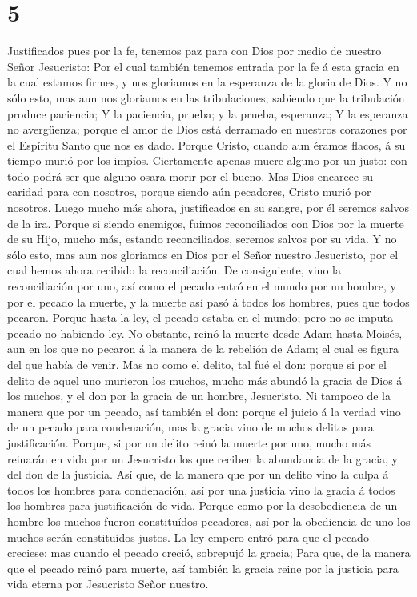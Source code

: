 \hypertarget{section-4}{%
\section{5}\label{section-4}}

 Justificados pues por la fe, tenemos paz para con Dios
por medio de nuestro Señor Jesucristo:  Por el cual
también tenemos entrada por la fe á esta gracia en la cual estamos
firmes, y nos gloriamos en la esperanza de la gloria de Dios.
 Y no sólo esto, mas aun nos gloriamos en las
tribulaciones, sabiendo que la tribulación produce paciencia;
 Y la paciencia, prueba; y la prueba, esperanza;
 Y la esperanza no avergüenza; porque el amor de Dios está
derramado en nuestros corazones por el Espíritu Santo que nos es dado.
 Porque Cristo, cuando aun éramos flacos, á su tiempo
murió por los impíos.  Ciertamente apenas muere alguno por
un justo: con todo podrá ser que alguno osara morir por el bueno.
 Mas Dios encarece su caridad para con nosotros, porque
siendo aún pecadores, Cristo murió por nosotros.  Luego
mucho más ahora, justificados en su sangre, por él seremos salvos de la
ira.  Porque si siendo enemigos, fuimos reconciliados con
Dios por la muerte de su Hijo, mucho más, estando reconciliados, seremos
salvos por su vida.  Y no sólo esto, mas aun nos
gloriamos en Dios por el Señor nuestro Jesucristo, por el cual hemos
ahora recibido la reconciliación.  De consiguiente, vino
la reconciliación por uno, así como el pecado entró en el mundo por un
hombre, y por el pecado la muerte, y la muerte así pasó á todos los
hombres, pues que todos pecaron.  Porque hasta la ley, el
pecado estaba en el mundo; pero no se imputa pecado no habiendo ley.
 No obstante, reinó la muerte desde Adam hasta Moisés,
aun en los que no pecaron á la manera de la rebelión de Adam; el cual es
figura del que había de venir.  Mas no como el delito,
tal fué el don: porque si por el delito de aquel uno murieron los
muchos, mucho más abundó la gracia de Dios á los muchos, y el don por la
gracia de un hombre, Jesucristo.  Ni tampoco de la manera
que por un pecado, así también el don: porque el juicio á la verdad vino
de un pecado para condenación, mas la gracia vino de muchos delitos para
justificación.  Porque, si por un delito reinó la muerte
por uno, mucho más reinarán en vida por un Jesucristo los que reciben la
abundancia de la gracia, y del don de la justicia.  Así
que, de la manera que por un delito vino la culpa á todos los hombres
para condenación, así por una justicia vino la gracia á todos los
hombres para justificación de vida.  Porque como por la
desobediencia de un hombre los muchos fueron constituídos pecadores, así
por la obediencia de uno los muchos serán constituídos justos.
 La ley empero entró para que el pecado creciese; mas
cuando el pecado creció, sobrepujó la gracia;  Para que,
de la manera que el pecado reinó para muerte, así también la gracia
reine por la justicia para vida eterna por Jesucristo Señor nuestro.

